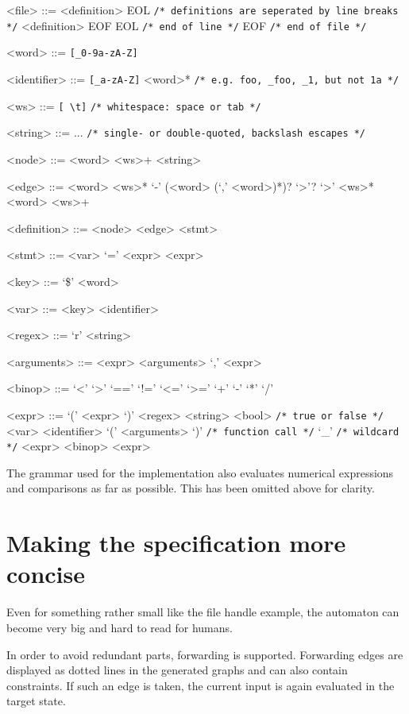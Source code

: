 \begin{grammar}
<file> ::= <definition> EOL \verb|/* definitions are seperated by line breaks */|
\alt <definition> EOF
\alt EOL \verb|/* end of line */|
\alt EOF \verb|/* end of file */|

<word> ::= \verb|[_0-9a-zA-Z]|

<identifier> ::= \verb|[_a-zA-Z]| <word>* \verb|/* e.g. foo, _foo, _1, but not 1a */|

<ws>   ::= \verb|[ \t]| \verb|/* whitespace: space or tab */|

<string> ::= ... \verb|/* single- or double-quoted, backslash escapes */|

<node> ::= <word> <ws>+ <string>

<edge> ::= <word> <ws>* `-' (<word> (`,' <word>)*)? `>'? `>' <ws>* <word> <ws>+

<definition> ::= <node>
\alt <edge> <stmt>

<stmt> ::= <var> `=' <expr>
\alt <expr>

<key> ::= `\$' <word>

<var> ::= <key>
\alt <identifier>

<regex> ::= `r' <string>

<arguments> ::= <expr>
\alt <arguments> `,' <expr>

<binop> ::= `<' \alt `>' \alt `==' \alt `!=' \alt `<=' \alt `>=' \alt `+' \alt `-' \alt `*' \alt `/'

<expr> ::= `(' <expr> `)'
\alt <regex>
\alt <string>
\alt <bool> \verb|/* true or false */|
\alt <var>
\alt <identifier> `(' <arguments> `)' \verb|/* function call */|
\alt `_' \verb|/* wildcard */|
\alt <expr> <binop> <expr>
\end{grammar}
The grammar used for the implementation also evaluates numerical expressions and comparisons as far as possible. This has been omitted above for clarity.


\section{Making the specification more concise}
Even for something rather small like the file handle example, the automaton can become very big and hard to read for humans.

In order to avoid redundant parts, forwarding is supported. Forwarding edges are displayed as dotted lines in the generated graphs and can also contain constraints. If such an edge is taken, the current input is again evaluated in the target state.

